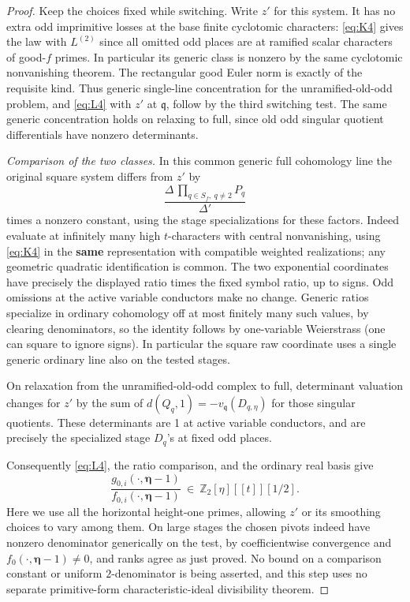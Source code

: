 \begin{proof}
Keep the choices fixed while switching. Write \(z'\) for this system. It has no extra odd imprimitive losses at the base finite cyclotomic characters: \eqref{eq:K4} gives the law with \(L^{(2)}\) since all omitted odd places are at ramified scalar characters of good-\(f\) primes. In particular its generic class is nonzero by the same cyclotomic nonvanishing theorem. The rectangular good Euler norm is exactly of the requisite kind. Thus generic single-line concentration for the unramified-old-odd problem, and \eqref{eq:L4} with \(z'\) at \(\mathfrak q\), follow by the third switching test. The same generic concentration holds on relaxing to full, since old odd singular quotient differentials have nonzero determinants.

\emph{Comparison of the two classes.}
In this common generic full cohomology line the original square system differs from \(z'\) by
\[
             \frac{\Delta\,\prod_{q\in S_f,\ q\ne2}P_q}{\Delta'}
\]
times a nonzero constant, using the stage specializations for these factors. Indeed evaluate at infinitely many high \(t\)-characters with central nonvanishing, using \eqref{eq:K4} in the \textbf{same} representation with compatible weighted realizations; any geometric quadratic identification is common. The two exponential coordinates have precisely the displayed ratio times the fixed symbol ratio, up to signs. Odd omissions at the active variable conductors make no change. Generic ratios specialize in ordinary cohomology off at most finitely many such values, by clearing denominators, so the identity follows by one-variable Weierstrass (one can square to ignore signs). In particular the square raw coordinate uses a single generic ordinary line also on the tested stages. 

On relaxation from the unramified-old-odd complex to full, determinant valuation changes for \(z'\) by the sum of \(d(Q_q,1)=-v_{\mathfrak q}(D_{q,\eta})\) for those singular quotients. These determinants are 1 at active variable conductors, and are precisely the specialized stage \(D_q\)'s at fixed odd places. 

Consequently \eqref{eq:L4}, the ratio comparison, and the ordinary real basis give
\[
 \frac{g_{0,i}(\cdot,\boldsymbol\eta-1)}
      {f_{0,i}(\cdot,\boldsymbol\eta-1)}
                 \ \in\ \mathbb Z_2[\eta][[t]][1/2].
\]
Here we use all the horizontal height-one primes, allowing \(z'\) or its smoothing choices to vary among them. On large stages the chosen pivots indeed have nonzero denominator generically on the test, by coefficientwise convergence and \(f_0(\cdot,\boldsymbol\eta-1)\ne0\), and ranks agree as just proved. No bound on a comparison constant or uniform \(2\)-denominator is being asserted, and this step uses no separate primitive-form characteristic-ideal divisibility theorem.


\end{proof}
